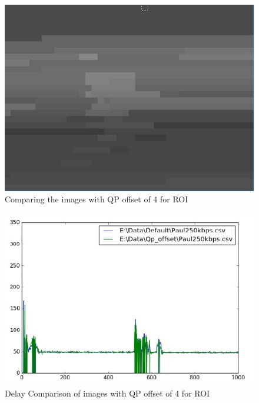 \documentclass[11pt]{article} %
\begin{document}
\begin{figure}[!h]
    \includegraphics[scale=0.4]{QPOffset/paul120_250kbps_QPoffset4_quant}    
    \caption{Comparing the images with QP offset of 4 for ROI}
    \label{fig:Default_QPOffsetCompare}
\end{figure}

\begin{figure}[!h]
    \centering
    \includegraphics[scale=0.75]{QPOffset/Paul250kbps_QP_Offset_Delay}
    \caption{Delay Comparison of images with QP offset of 4 for ROI}
    \label{fig:DelayDefault_QPOffsetCompare}
\end{figure}
\end{document}
